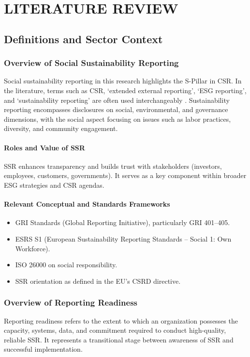 \chapter{LITERATURE REVIEW}

\section{Definitions and Sector Context}

\subsection{Overview of Social Sustainability Reporting}
Social sustainability reporting in this research highlights the S-Pillar in CSR. In the literature, terms such as CSR, ‘extended external reporting’, ‘ESG reporting’, and ‘sustainability reporting’ are often used interchangeably \parencite{Edge2022, Fiechter2022}. Sustainability reporting encompasses disclosures on social, environmental, and governance dimensions, with the social aspect focusing on issues such as labor practices, diversity, and community engagement.

\subsubsection{Roles and Value of SSR}
SSR enhances transparency and builds trust with stakeholders (investors, employees, customers, governments). It serves as a key component within broader ESG strategies and CSR agendas.

\subsubsection{Relevant Conceptual and Standards Frameworks}
\begin{itemize}
    \item GRI Standards (Global Reporting Initiative), particularly GRI 401–405.
    \item ESRS S1 (European Sustainability Reporting Standards – Social 1: Own Workforce).
    \item ISO 26000 on social responsibility.
    \item SSR orientation as defined in the EU’s CSRD directive.
\end{itemize}

\subsection{Overview of Reporting Readiness}
Reporting readiness refers to the extent to which an organization possesses the capacity, systems, data, and commitment required to conduct high-quality, reliable SSR. It represents a transitional stage between awareness of SSR and successful implementation.

